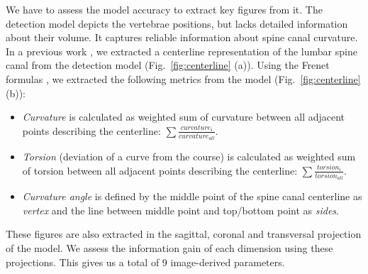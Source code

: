 \documentclass[a4paper,twoside]{style/article}
\newcommand{\com}[1]{\textcolor{orange}{\uline{#1}}}
\begin{document}
We have to assess the model accuracy to extract key figures from it.
The detection model depicts the vertebrae positions, but lacks detailed information about their volume.
It captures reliable information about spine canal curvature.
In a previous work \cite{KlemmVMV13, KlemmVIS14}, we extracted a centerline representation of the lumbar spine canal from the detection model (Fig.~\ref{fig:centerline} (a)).
Using the Frenet formulas \cite{Frenet}, we extracted the following metrics from the model (Fig.~\ref{fig:centerline} (b)):
\begin{itemize}
	\item \emph{Curvature} is calculated as weighted sum of curvature between all adjacent points describing the centerline: $\sum \frac{curvature_i}{curvature_{all}}$.
	\item \emph{Torsion} (deviation of a curve from the course) is calculated as weighted sum of torsion between all adjacent points describing the centerline: $\sum \frac{torsion_i}{torsion_{all}}$.
	\item \emph{Curvature angle} is defined by the middle point of the spine canal centerline as \emph{vertex} and the line between middle point and top/bottom point as \emph{sides}.
\end{itemize}
These figures are also extracted in the sagittal, coronal and transversal projection of the model.
We assess the information gain of each dimension using these projections.
This gives us a total of 9 image-derived parameters.


\end{document}
